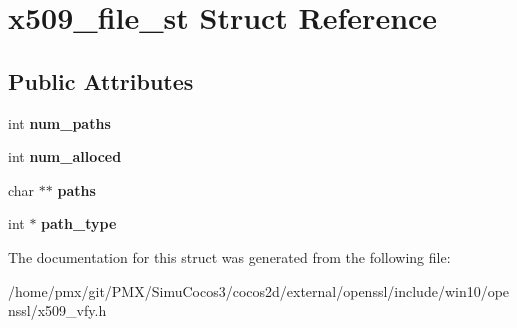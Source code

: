 \hypertarget{structx509__file__st}{}\section{x509\+\_\+file\+\_\+st Struct Reference}
\label{structx509__file__st}
\subsection*{Public Attributes}
\begin{DoxyCompactItemize}
\item 
\mbox{\label{structx509__file__st_a625533740392eada26b9522bfc5f563f}} 
int {\bfseries num\+\_\+paths}
\item 
\mbox{\label{structx509__file__st_a74ca798c37b4f0c937d6392d1a06eb97}} 
int {\bfseries num\+\_\+alloced}
\item 
\mbox{\label{structx509__file__st_aa90fe6de68309d7572b7516787bf235f}} 
char $\ast$$\ast$ {\bfseries paths}
\item 
\mbox{\label{structx509__file__st_a2ecd2de35656eb382770bcb7317cb3f4}} 
int $\ast$ {\bfseries path\+\_\+type}
\end{DoxyCompactItemize}


The documentation for this struct was generated from the following file\+:\begin{DoxyCompactItemize}
\item 
/home/pmx/git/\+P\+M\+X/\+Simu\+Cocos3/cocos2d/external/openssl/include/win10/openssl/x509\+\_\+vfy.\+h\end{DoxyCompactItemize}
